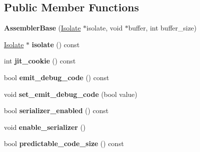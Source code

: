 \subsection*{Public Member Functions}
\begin{DoxyCompactItemize}
\item 
\hypertarget{classv8_1_1internal_1_1_assembler_base_a7ffa22cc463c9ee16ed46bfa38a5cd5b}{}{\bfseries Assembler\+Base} (\hyperlink{classv8_1_1internal_1_1_isolate}{Isolate} $\ast$isolate, void $\ast$buffer, int buffer\+\_\+size)\label{classv8_1_1internal_1_1_assembler_base_a7ffa22cc463c9ee16ed46bfa38a5cd5b}

\item 
\hypertarget{classv8_1_1internal_1_1_assembler_base_a51294386a61dda31ed1488228c48211a}{}\hyperlink{classv8_1_1internal_1_1_isolate}{Isolate} $\ast$ {\bfseries isolate} () const \label{classv8_1_1internal_1_1_assembler_base_a51294386a61dda31ed1488228c48211a}

\item 
\hypertarget{classv8_1_1internal_1_1_assembler_base_a47d3778081925b5ecf685b1a475c8057}{}int {\bfseries jit\+\_\+cookie} () const \label{classv8_1_1internal_1_1_assembler_base_a47d3778081925b5ecf685b1a475c8057}

\item 
\hypertarget{classv8_1_1internal_1_1_assembler_base_afc598637650acda081c8ebedb21ae3fc}{}bool {\bfseries emit\+\_\+debug\+\_\+code} () const \label{classv8_1_1internal_1_1_assembler_base_afc598637650acda081c8ebedb21ae3fc}

\item 
\hypertarget{classv8_1_1internal_1_1_assembler_base_a1bcbeda264b5026c463490820c91ffab}{}void {\bfseries set\+\_\+emit\+\_\+debug\+\_\+code} (bool value)\label{classv8_1_1internal_1_1_assembler_base_a1bcbeda264b5026c463490820c91ffab}

\item 
\hypertarget{classv8_1_1internal_1_1_assembler_base_a43270aa31fe8878c96b1cb2f07e11c17}{}bool {\bfseries serializer\+\_\+enabled} () const \label{classv8_1_1internal_1_1_assembler_base_a43270aa31fe8878c96b1cb2f07e11c17}

\item 
\hypertarget{classv8_1_1internal_1_1_assembler_base_a602b8f228f5491bdf8d02e7f3a55fdc9}{}void {\bfseries enable\+\_\+serializer} ()\label{classv8_1_1internal_1_1_assembler_base_a602b8f228f5491bdf8d02e7f3a55fdc9}

\item 
\hypertarget{classv8_1_1internal_1_1_assembler_base_afdc8e88acea34bc05e20f10a7e511264}{}bool {\bfseries predictable\+\_\+code\+\_\+size} () const \label{classv8_1_1internal_1_1_assembler_base_afdc8e88acea34bc05e20f10a7e511264}


\end{DoxyCompactItemize}
